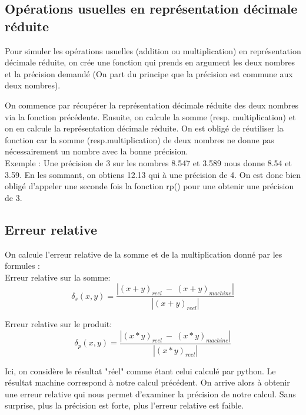 \documentclass{article}
\begin{document}
\subsection*{Opérations usuelles en représentation décimale réduite}

Pour simuler les opérations usuelles (addition ou multiplication) en représentation décimale réduite, on crée une fonction qui prends en argument les deux nombres et la précision demandé (On part du principe que la précision est commune aux deux nombres).

On commence par récupérer la représentation décimale réduite des deux nombres via la fonction précédente. Ensuite, on calcule la somme (resp. multiplication) et on en calcule la représentation décimale réduite. On est obligé de réutiliser la fonction car la somme (resp.multiplication) de deux nombres ne donne pas nécessairement un nombre avec la bonne précision. \\

Exemple :
Une précision de 3 sur les nombres 8.547 et 3.589 nous donne 8.54 et 3.59. En les sommant, on obtiens 12.13 qui à une précision de 4. On est donc bien obligé d'appeler une seconde fois la fonction rp() pour une obtenir une précision de 3.

\subsection*{Erreur relative}

On calcule l'erreur relative de la somme et de la multiplication donné par les formules :
\\

Erreur relative sur la somme:
\begin{equation}
\delta_{s}(x,y) = \frac{ \left |  (x+y)_{reel}\ - \ (x+y)_{machine} \right | }{\left |  (x+y)_{reel} \right | }
\label{erreur_relative_sur_la_somme}
\end{equation}

Erreur relative sur le produit:
\begin{equation}
\delta_{p}(x,y) = \frac{ \left |  (x*y)_{reel}\ - \ (x*y)_{machine} \right | }{\left |  (x*y)_{reel} \right | }
\label{erreur_relative_sur_le_produi}
\end{equation}

Ici, on considère le résultat "réel" comme étant celui calculé par python. Le résultat machine correspond à notre calcul précédent. On arrive alors à obtenir une erreur relative qui nous permet d'examiner la précision de notre calcul. 
Sans surprise, plus la précision est forte, plus l'erreur relative est faible.
\end{document}
